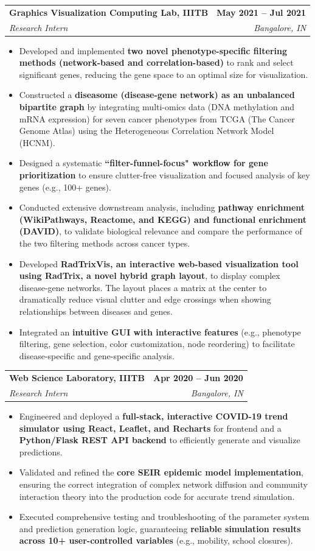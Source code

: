 \documentclass[letterpaper,11pt]{article}
\makeatletter
\newcommand{\resumeItem}[1]{
  \item\small{
    {#1 \vspace{-2pt}}
  }
}
\newcommand{\resumeSubheading}[4]{
  \vspace{-2pt}\item
    \begin{tabular*}{1.0\textwidth}[t]{l@{\extracolsep{\fill}}r}
      \textbf{#1} & \textbf{\small #2} \\
      \textit{\small#3} & \textit{\small #4} \\
    \end{tabular*}\vspace{-7pt}
}
\newcommand{\resumeItemListStart}{\begin{itemize}}
\newcommand{\resumeItemListEnd}{\end{itemize}\vspace{-5pt}}
\makeatother
\begin{document}
\resumeSubheading
{Graphics Visualization Computing Lab, IIITB \href{https://drive.google.com/file/d/1oNTaE8Omw0AsDx3I-SSY7yNkdDnR_xYY/view?usp=sharing}{\raisebox{-0.2\height}\faExternalLink}}{May 2021 -- Jul 2021}
{Research Intern}{Bangalore, IN}
\resumeItemListStart
\resumeItem{Developed and implemented \textbf{two novel phenotype-specific filtering methods (network-based and correlation-based)} to rank and select significant genes, reducing the gene space to an optimal size for visualization.}
\resumeItem{Constructed a \textbf{diseasome (disease-gene network) as an unbalanced bipartite graph} by integrating multi-omics data (DNA methylation and mRNA expression) for seven cancer phenotypes from TCGA (The Cancer Genome Atlas) using the Heterogeneous Correlation Network Model (HCNM).}
\resumeItem{Designed a systematic \textbf{``filter-funnel-focus" workflow for gene prioritization} to ensure clutter-free visualization and focused analysis of key genes (e.g., 100+ genes).}
\resumeItem{Conducted extensive downstream analysis, including \textbf{pathway enrichment (WikiPathways, Reactome, and KEGG) and functional enrichment (DAVID)}, to validate biological relevance and compare the performance of the two filtering methods across cancer types.}
\resumeItem{Developed \textbf{RadTrixVis, an interactive web-based visualization tool using RadTrix, a novel hybrid graph layout}, to display complex disease-gene networks. The layout places a matrix at the center to dramatically reduce visual clutter and edge crossings when showing relationships between diseases and genes.}
\resumeItem{Integrated an \textbf{intuitive GUI with interactive features} (e.g., phenotype filtering, gene selection, color customization, node reordering) to facilitate disease-specific and gene-specific analysis.}
\resumeItemListEnd

\resumeSubheading
{Web Science Laboratory, IIITB}{Apr 2020 -- Jun 2020}
{Research Intern}{Bangalore, IN}
\resumeItemListStart
\resumeItem{Engineered and deployed a \textbf{full-stack, interactive COVID-19 trend simulator using React, Leaflet, and Recharts} for frontend and a \textbf{Python/Flask REST API backend} to efficiently generate and visualize predictions.}
\resumeItem{Validated and refined the \textbf{core SEIR epidemic model implementation}, ensuring the correct integration of complex network diffusion and community interaction theory into the production code for accurate trend simulation.}
\resumeItem{Executed comprehensive testing and troubleshooting of the parameter system and prediction generation logic, guaranteeing \textbf{reliable simulation results across 10+ user-controlled variables} (e.g., mobility, school closures).}
\resumeItemListEnd
\end{document}
